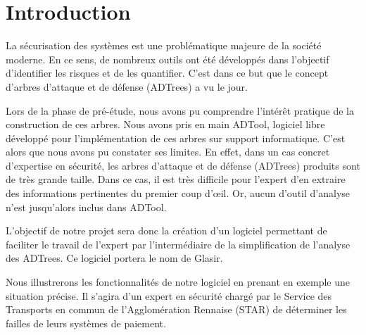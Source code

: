 \section{Introduction}
	
	La sécurisation des systèmes est une problématique majeure de la société moderne. En ce sens, de nombreux outils ont été développés dans l'objectif d'identifier les risques et de les quantifier. C'est dans ce but que le concept d'arbres d'attaque et de défense (ADTrees) a vu le jour.
	
	Lors de la phase de pré-étude, nous avons pu comprendre l’intérêt pratique de la construction de ces arbres. Nous avons pris en main ADTool, logiciel libre développé pour l'implémentation de ces arbres sur support informatique. C'est alors que nous avons pu constater ses limites. En effet, dans un cas concret d'expertise en sécurité, les arbres d'attaque et de défense (ADTrees) produits sont de très grande taille. Dans ce cas, il est très difficile pour l'expert d'en extraire des informations pertinentes du premier coup d’œil. Or, aucun d'outil d'analyse n'est jusqu'alors inclus dans ADTool.

	L'objectif de notre projet sera donc la création d'un logiciel permettant de faciliter le travail de l'expert par l’intermédiaire de la simplification de l'analyse des ADTrees. Ce logiciel portera le nom de Glasir.

	Nous illustrerons les fonctionnalités de notre logiciel en prenant en exemple une situation précise. Il s'agira d'un expert en sécurité chargé par le Service des Transports en commun de l'Agglomération Rennaise (STAR) de déterminer les failles de leurs systèmes de paiement. 













